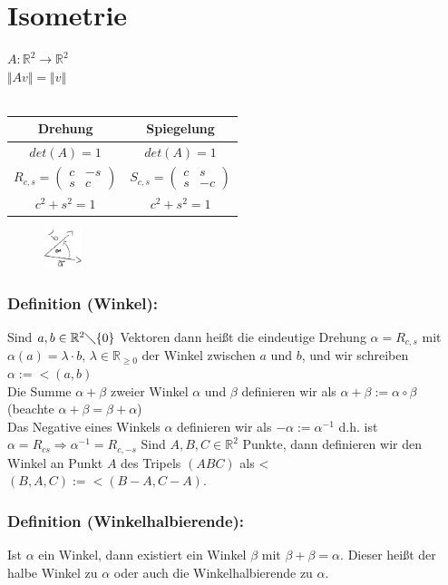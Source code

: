 \section{Isometrie}
$A: \mathbb{R}^{2} \rightarrow \mathbb{R}^{2}$\\
$\Vert Av \Vert = \Vert v \Vert$\\
\qquad\\
 \begin{tabular}{c|c}
 	Drehung & Spiegelung \\ \hline
  	$det(A) = 1$ & $det(A) = 1$ \\ 
  	$R_{c,s}=\begin{pmatrix} c & -s \\ s & c \end{pmatrix}$ & $S_{c,s} = \begin{pmatrix} c & s \\ s & -c \end{pmatrix}$\\
 	$c^{2}+s^{2} = 1$ & $c^{2}+s^{2} = 1$\\
 \end{tabular}
 \begin{figure}[H]
 \centering
\includegraphics[width=0.1\textwidth]{mainmatter/chapter1/pics/bewegung2.png}
\end{figure}
 \subsubsection{Definition (Winkel):}
 Sind $a,b \in \mathbb{R}^{2}\diagdown \{0\}$ Vektoren dann heißt die eindeutige Drehung $\alpha =R_{c,s}$ mit $\alpha(a)=\lambda\cdot b, \, \lambda \in \mathbb{R}_{\geq 0}$ der Winkel zwischen $a$ und $b$, und wir schreiben $\alpha := < (a,b)$\\
 Die Summe $\alpha + \beta$ zweier Winkel $\alpha$ und $\beta$ definieren wir als $\alpha + \beta := \alpha \circ \beta$ (beachte $\alpha + \beta = \beta + \alpha$)\\
 Das Negative eines Winkels $\alpha$ definieren wir als $-\alpha := \alpha ^{-1}$ d.h. ist $\alpha = R_{cs} \Rightarrow \alpha^{-1} = R_{c,-s}$ Sind $A,B,C \in \mathbb{R}^{2}$ Punkte, dann definieren wir den Winkel an Punkt $A$ des Tripels $(ABC)$ als < $(B,A,C) := < (B-A,C-A)$. 
 \subsubsection{Definition (Winkelhalbierende):}
 Ist $\alpha$ ein Winkel, dann existiert ein Winkel $\beta$ mit $\beta + \beta = \alpha$. Dieser heißt der halbe Winkel zu $\alpha$ oder auch die Winkelhalbierende zu $\alpha$.
